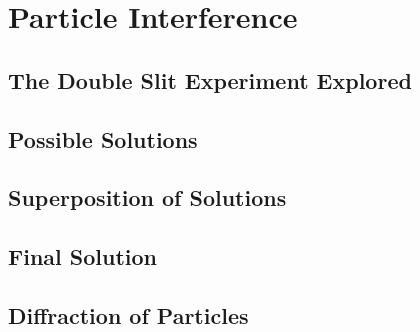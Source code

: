 \documentclass[../../Quantum-Technologies-Notes]{subfiles}
\begin{document}
	
	\ifSubfilesClassLoaded{ \pagestyle{fancy} }
	
	
	\section{Particle Interference}
		
		\subsection{The Double Slit Experiment Explored}
			
			
			
			
			
			\vspace{2cm}
			
			
			
			\vspace{2cm}
			
			
			
			\vspace{2cm}
			
			
			
			\vspace{2cm}
			
			
	
			
			
			
		\subsection{Possible Solutions}
			
			
		\subsection{Superposition of Solutions}
			
			
		\subsection{Final Solution}
			
			
		\subsection{Diffraction of Particles}
			
			\vspace{4cm}
			
			
\end{document}
